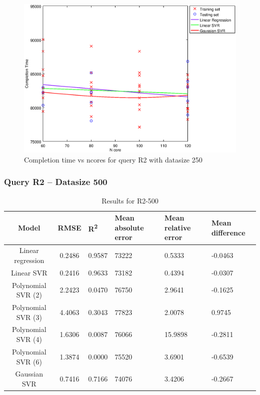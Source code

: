 \documentclass[a4paper,11pt]{article}
\begin{document}
\begin {figure}[hbtp]
\centering
\includegraphics[width=\textwidth]{output/R2_250_LINEAR_NCORE/plot_R2_250_bestmodels.eps}
\caption{Completion time vs ncores for query R2 with datasize 250}
\label{fig:all_linear_R2_250}
\end {figure}

\newpage
\subsubsection{Query R2 -- Datasize 500}
\begin{table}[H]
	\centering
	\begin{adjustbox}{center}
		\begin{tabular}{c | c M{1.2cm} M{2.5cm} M{2.5cm} M{1.8cm}}
			Model & RMSE & R\textsuperscript{2} & Mean absolute error & Mean relative error & Mean difference \tabularnewline
			\hline
			Linear regression & 0.2486 & 0.9587 &  73222 & 0.5333 & -0.0463 \\
			Linear SVR & 0.2416 & 0.9633 &  73182 & 0.4394 & -0.0307 \\
			Polynomial SVR (2) & 2.2423 & 0.0470 &  76750 & 2.9641 & -0.1625 \\
			Polynomial SVR (3) & 4.4063 & 0.3043 &  77823 & 2.0078 & 0.9745 \\
			Polynomial SVR (4) & 1.6306 & 0.0087 &  76066 & 15.9898 & -0.2811 \\
			Polynomial SVR (6) & 1.3874 & 0.0000 &  75520 & 3.6901 & -0.6539 \\
			Gaussian SVR & 0.7416 & 0.7166 &  74076 & 3.4206 & -0.2667 \\
		\end{tabular}
	\end{adjustbox}
	\\
	\caption{Results for R2-500}
	\label{fig:all_linear_R2_500}
\end{table}
\end{document}
